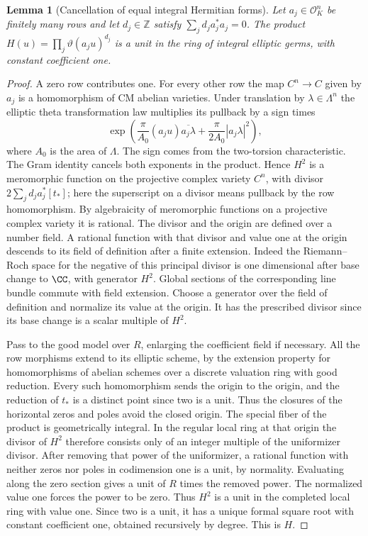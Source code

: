 \documentclass[a4paper,11pt]{article}
\newtheorem{lemma}[proposition]{Lemma}
\theoremstyle{definition}
\theoremstyle{remark}
\newcommand{\ZZ}{\mathbb Z}\newcommand{\ord}{\operatorname{ord}}
\numberwithin{equation}{section}
\begin{document}
\begin{lemma}[Cancellation of equal integral Hermitian forms]\label{lem:rational66}
Let \(a_j\in\mathcal O_K^n\) be finitely many rows and let
\(d_j\in\ZZ\) satisfy \(\sum_j d_j a_j^*a_j=0\).
The product \(H(u)=\prod_j\vartheta(a_j u)^{d_j}\) is a unit
in the ring of integral elliptic germs, with constant coefficient one.
\end{lemma}
\begin{proof}
A zero row contributes one. For every other row the map
\(C^n\to C\) given by \(a_j\) is a homomorphism of CM abelian
varieties. Under translation by \(\lambda\in\Lambda^n\) the
elliptic theta transformation law multiplies its pullback by
a sign times
\[
  \exp\!\left(\frac{\pi}{A_0}(a_j u)\overline{a_j\lambda}
                  +\frac{\pi}{2A_0}|a_j\lambda|^2\right),
\]
where \(A_0\) is the area of \(\Lambda\). The sign comes from
the two-torsion characteristic. The Gram identity cancels both
exponents in the product. Hence \(H^2\) is a meromorphic
function on the projective complex variety \(C^n\), with divisor
\(2\sum_j d_j a_j^*[t_*]\); here the superscript on a divisor
means pullback by the row homomorphism. By algebraicity of
meromorphic functions on a projective complex variety it is
rational. The divisor and the origin are defined over a number
field. A rational function with that divisor and value one at
the origin descends to its field of definition after a finite
extension. Indeed the Riemann--Roch space for the negative of
this principal divisor is one dimensional after base change
to \(\CC\), with generator \(H^2\). Global sections of the
corresponding line bundle commute with field extension.
Choose a generator over the field of definition and normalize
its value at the origin. It has the prescribed divisor since
its base change is a scalar multiple of \(H^2\).

Pass to the good model over \(R\), enlarging the coefficient field
if necessary. All the row morphisms extend to its elliptic scheme,
by the extension property for homomorphisms of abelian schemes
over a discrete valuation ring with good reduction. Every such
homomorphism sends the origin to the origin, and the reduction of
\(t_*\) is a distinct point since two is a unit. Thus the closures
of the horizontal zeros and poles avoid the closed origin.
The special fiber of the product is geometrically integral.
In the regular local ring at that origin the divisor of \(H^2\)
therefore consists only of an integer multiple of the uniformizer
divisor. After removing that power of the uniformizer, a rational
function with neither zeros nor poles in codimension one is a unit,
by normality. Evaluating along the zero section gives a unit of
\(R\) times the removed power. The normalized value one forces
the power to be zero. Thus \(H^2\) is a unit in the completed
local ring with value one. Since two is a unit, it has a unique
formal square root with constant coefficient one, obtained
recursively by degree. This is \(H\).
\end{proof}
\end{document}
